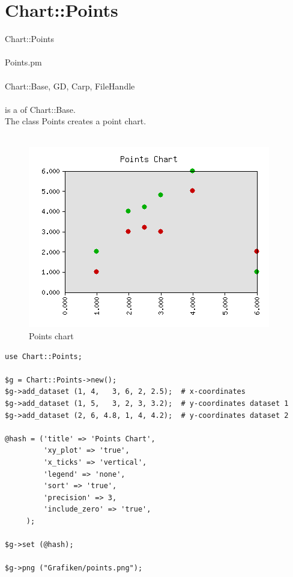 \section{Chart::Points}
 Chart::Points\\ \\
 Points.pm\\ \\
Chart::Base, GD, Carp, FileHandle\\ \\
  is a  of Chart::Base.\\
The class Points creates a point chart.\\
\\
\begin{figure}[h]
	\begin{center}
		\includegraphics[scale=0.5]{points.png}
	\end{center}
	\caption{Points chart}
	\label{fig:points}
\end{figure}
\begin{verbatim}
use Chart::Points;

$g = Chart::Points->new();
$g->add_dataset (1, 4,   3, 6, 2, 2.5);  # x-coordinates
$g->add_dataset (1, 5,   3, 2, 3, 3.2);  # y-coordinates dataset 1
$g->add_dataset (2, 6, 4.8, 1, 4, 4.2);  # y-coordinates dataset 2

@hash = ('title' => 'Points Chart',
         'xy_plot' => 'true',
         'x_ticks' => 'vertical',
         'legend' => 'none',
         'sort' => 'true',
         'precision' => 3,
         'include_zero' => 'true',
	 );

$g->set (@hash);

$g->png ("Grafiken/points.png");

\end{verbatim}

